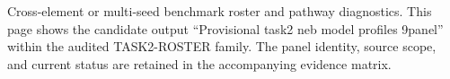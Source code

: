 Cross-element or multi-seed benchmark roster and pathway diagnostics. This page shows the candidate output ``Provisional task2 neb model profiles 9panel'' within the audited TASK2-ROSTER family. The panel identity, source scope, and current status are retained in the accompanying evidence matrix.
